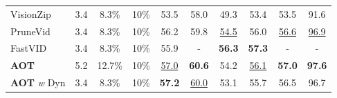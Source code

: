 \begin{table}[t]
{\begin{tabular}{l|ccc|cccc|cc}
\midrule
VisionZip~\cite{yang2025visionzip} & 3.4 & 8.3\% & 10\% 
& 53.5 & 58.0 & 49.3 & 53.4 & 53.5 & 91.6 \\ %

PruneVid~\cite{huang2024prunevid} & 3.4 & 8.3\% & 10\% 
 & 56.2 & 59.8 & \underline{54.5} & 56.0 & \underline{56.6} & \underline{96.9} \\ %

FastVID~\cite{shen2025fastvid} & 3.4 & 8.3\% & 10\% 
& 55.9 & - & \textbf{56.3} & \textbf{57.3} & - & - \\

\textbf{AOT} & 5.2 & 12.7\% & 10\%
& \underline{57.0}  & \textbf{60.6} & 54.2 & \underline{56.1} & \textbf{57.0} & \textbf{97.6} \\ %

\textbf{AOT} \textit{w} Dyn & 3.4 & 8.3\% & 10\%
& \textbf{57.2}  & \underline{60.0} & 53.1 & 55.7 & 56.5 & 96.7 \\ %

\bottomrule

\end{tabular}
}
\label{tab:dynamic_ov_benchmark}
\vspace{-0.2cm}
\end{table}



